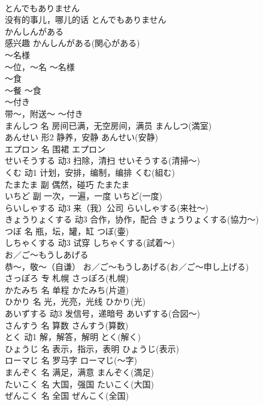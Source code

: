 \documentclass[8pt]{extreport}
\begin{document}
\begin{CJK}{UTF8}{min}
\\	とんでもありません	
\\	没有的事儿，哪儿的话	とんでもありません	
\\	かんしんがある	
\\	感兴趣	かんしんがある(関心がある)	
\\	～名様	
\\	～位，～名	～名様	
\\	～食	
\\	～餐	～食	
\\	～付き	
\\	带～，附送～	～付き	
\\	まんしつ	名	房间已满，无空房间，满员	まんしつ(満室)	
\\	あんせい	形2	静养，安静	あんせい(安静)	
\\	エプロン	名	围裙	エプロン	
\\	せいそうする	动3	扫除，清扫	せいそうする(清掃～)	
\\	くむ	动1	计划，安排，编制，编排	くむ(組む)	
\\	たまたま	副	偶然，碰巧	たまたま	
\\	いちど	副	一次，一遍，一度	いちど(一度)	
\\	らいしゃする	动3	来（我）公司	らいしゃする(来社～)	
\\	きょうりょくする	动3	合作，协作，配合	きょうりょくする(協力～)	
\\	つぼ	名	瓶，坛，罐，缸	つぼ(壷)	
\\	しちゃくする	动3	试穿	しちゃくする(試着～)	
\\	お／ご～もうしあげる	
\\	恭～，敬～（自谦）	お／ご～もうしあげる(お／ご～申し上げる)	
\\	さっぽろ	专	札幌	さっぽろ(札幌)	
\\	かたみち	名	单程	かたみち(片道)	
\\	ひかり	名	光，光亮，光线	ひかり(光)	
\\	あいずする	动3	发信号，递暗号	あいずする(合図～)	
\\	さんすう	名	算数	さんすう(算数)	
\\	とく	动1	解，解答，解明	とく(解く)	
\\	ひょうじ	名	表示，指示，表明	ひょうじ(表示)	
\\	ローマじ	名	罗马字	ローマじ(～字)	
\\	まんぞく	名	满足，满意	まんぞく(満足)	
\\	たいこく	名	大国，强国	たいこく(大国)	
\\	ぜんこく	名	全国	ぜんこく(全国)	

\end{CJK}
\end{document}
